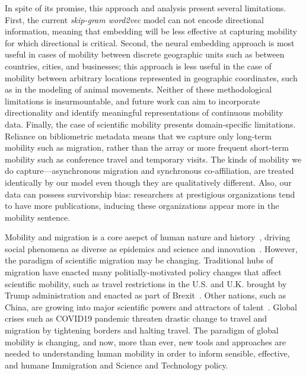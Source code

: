 \documentclass[12pt]{article} %
\begin{document}
In spite of its promise, this approach and analysis present several limitations.
First, the current \textit{skip-gram word2vec} model can not encode directional information, meaning that embedding will be less effective at capturing mobility for which directional is critical.
Second, the neural embedding approach is most useful in cases of mobility between discrete geographic units such as between countries, cities, and businesses; this approach is less useful in the case of mobility between arbitrary locations represented in geographic coordinates, such as in the modeling of animal movements.
Neither of these methodological limitations is insurmountable, and future work can aim to incorporate directionality and identify meaningful representations of continuous mobility data.
Finally, the case of scientific mobility presents domain-specific limitations.
Reliance on bibliometric metadata means that we capture only long-term mobility such as migration, rather than the array or more frequent short-term mobility such as conference travel and temporary visits.
The kinds of mobility we do capture—asynchronous migration and synchronous co-affiliation, are treated identically by our model even though they are qualitatively different.
Also, our data can possess survivorship bias: researchers at prestigious organizations tend to have more publications, inducing these organizations appear more in the mobility sentence.


Mobility and migration is a core asepct of human nature and history~\autocite{shah2020migration}, driving social phenomena as diverse as epidemics\autocite{kraemer2020covid, truscott2012epidemicgravity, xia2005measlesgravity} and science and innovation~\autocite{kaiser2018innovation, armano2017innovation, sugimoto2017mostimpact, petersen2018multiscale, franzoni2014advantage, morgan2018prestige, rodrigues2016mobility}.
However, the paradigm of scientific migration may be changing.
Traditional hubs of migration have enacted many politially-motivated policy changes that affect scientific mobility, such as travel restrictions in the U.S. and U.K. brought by Trump administration and enacted as part of Brexit~\autocite{chinchilla2018travelban}.
Other nations, such as China, are growing into major scientific powers and attractors of talent~\autocite{tollefson2018china, cao2020returning}.
Global crises such as COVID19 pandemic threaten drastic change to travel and migration by tightening borders and halting travel.
The paradigm of global mobility is changing, and now, more than ever, new tools and approaches are needed to understanding human mobility in order to inform sensible, effective, and humane Immigration and Science and Technology policy.
\end{document}
